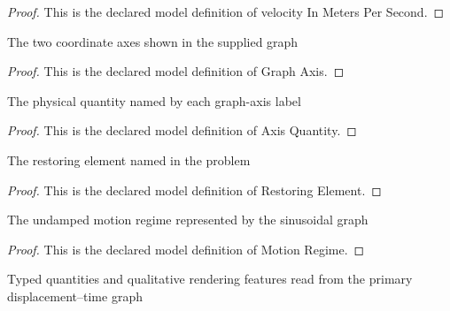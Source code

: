 \begin{proof}
  This is the declared model definition of velocity In Meters Per Second.
\end{proof}
\begin{definition}
  \label{def:physics:phyx-mini-0717:phyxminiproblems-problemphyxmini0717-graphaxis}
  The two coordinate axes shown in the supplied graph
\end{definition}
\begin{proof}
  This is the declared model definition of Graph Axis.
\end{proof}
\begin{definition}
  \label{def:physics:phyx-mini-0717:phyxminiproblems-problemphyxmini0717-axisquantity}
  The physical quantity named by each graph-axis label
\end{definition}
\begin{proof}
  This is the declared model definition of Axis Quantity.
\end{proof}
\begin{definition}
  \label{def:physics:phyx-mini-0717:phyxminiproblems-problemphyxmini0717-restoringelement}
  The restoring element named in the problem
\end{definition}
\begin{proof}
  This is the declared model definition of Restoring Element.
\end{proof}
\begin{definition}
  \label{def:physics:phyx-mini-0717:phyxminiproblems-problemphyxmini0717-motionregime}
  The undamped motion regime represented by the sinusoidal graph
\end{definition}
\begin{proof}
  This is the declared model definition of Motion Regime.
\end{proof}
\begin{definition}
  \label{def:physics:phyx-mini-0717:phyxminiproblems-problemphyxmini0717-displacementtimegraph}
  Typed quantities and qualitative rendering features read from the primary displacement--time graph
\end{definition}
